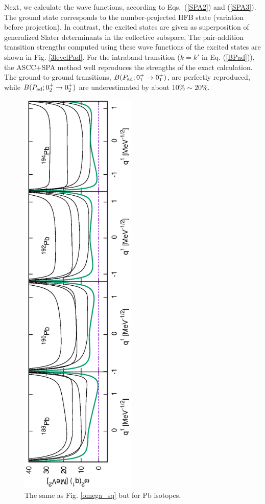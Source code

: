 \documentclass[11pt]{book} %
\begin{document}
Next, we calculate the wave functions,
according to Eqs.~(\ref{SPA2}) and (\ref{SPA3}).
The ground state corresponds to the number-projected HFB state
(variation before projection).
In contrast, the excited states are given as superposition of
generalized Slater determinants in the collective subspace,
The pair-addition transition strengths
computed using these wave functions of the excited states
are shown in Fig. \ref{3levelPad}.
For the intraband transition ($k=k'$ in Eq. (\ref{BPad})),
the ASCC+SPA method well reproduces the strengths of the exact calculation.
The ground-to-ground transitions, $B(P_{\rm ad};0_1^+\rightarrow 0_1^+)$, 
are perfectly reproduced, while
$B(P_{\rm ad};0_2^+\rightarrow 0_2^+)$ are underestimated 
by about $10\%\sim20\%$.
\begin{figure}[tb]
 \begin{center}
  \includegraphics[width=55mm,angle=-90]{images/Pbomega_sq.eps}
 \end{center}
	\caption{The same as Fig. \ref{omega_sq} but for Pb isotopes.
}
 \label{Pb_omega_sq}
\end{figure}
\end{document}
